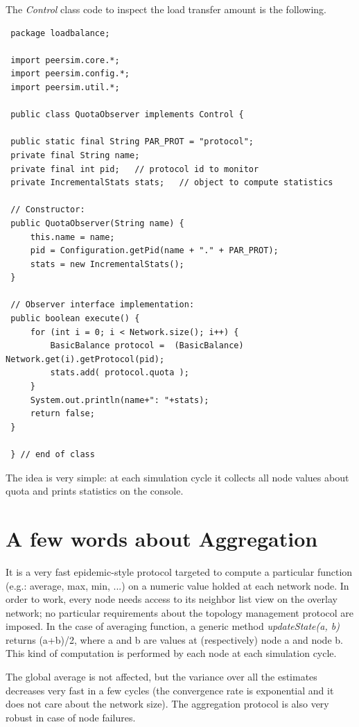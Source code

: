 \documentclass[a4paper,11pt]{article}
\begin{document}
The \emph{Control} class code to inspect the load transfer amount
is the following. 

\footnotesize
\begin{verbatim}
 package loadbalance;
 
 import peersim.core.*;
 import peersim.config.*;
 import peersim.util.*;
 
 public class QuotaObserver implements Control {
 
 public static final String PAR_PROT = "protocol";
 private final String name;   
 private final int pid;   // protocol id to monitor
 private IncrementalStats stats;   // object to compute statistics
 
 // Constructor:
 public QuotaObserver(String name) {
     this.name = name;
     pid = Configuration.getPid(name + "." + PAR_PROT);
     stats = new IncrementalStats();
 }
 
 // Observer interface implementation:
 public boolean execute() {
     for (int i = 0; i < Network.size(); i++) {
         BasicBalance protocol =  (BasicBalance) Network.get(i).getProtocol(pid);
         stats.add( protocol.quota );
     }
     System.out.println(name+": "+stats);
     return false;
 }
 
 } // end of class
\end{verbatim}
\normalsize


The idea is very simple: at each simulation cycle it collects all
node values about quota and prints statistics on the console.


\appendix
\section{\label{sec:Appendix-A-aggregation}A few words about
Aggregation}

It is a very fast epidemic-style protocol targeted to compute a particular
function (e.g.: average, max, min, ...) on a numeric value holded
at each network node. In order to work, every node needs access to
its neighbor list view on the overlay network; no particular requirements
about the topology management protocol are imposed. In the case of
averaging function, a generic method \emph{updateState(a, b)} returns
(a+b)/2, where a and b are values at (respectively) node a and node
b. This kind of computation is performed by each node at each simulation
cycle.

The global average is not affected, but the variance over all the
estimates decreases very fast in a few cycles (the convergence rate
is exponential and it does not care about the network size). The aggregation
protocol is also very robust in case of node failures. 
\end{document}
